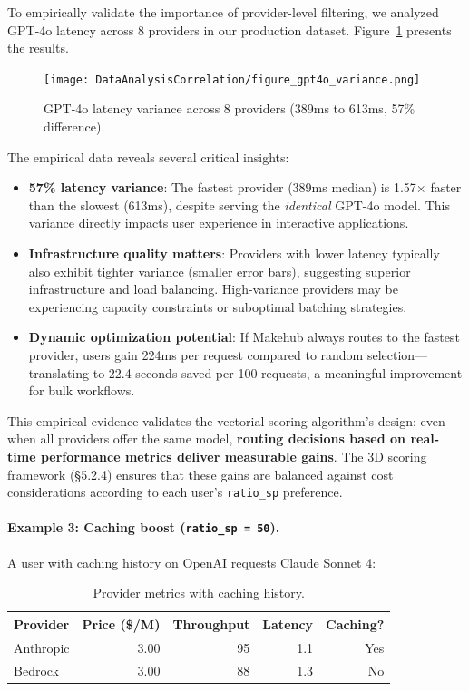 \documentclass[english]{article}
\begin{document}
To empirically validate the importance of provider-level filtering, we analyzed GPT-4o latency across 8 providers in our production dataset. Figure~\ref{fig:gpt4o_variance} presents the results.

\begin{figure}[H]
\centering
\texttt{[image: DataAnalysisCorrelation/figure\_gpt4o\_variance.png]}
\caption{GPT-4o latency variance across 8 providers (389ms to 613ms, 57\% difference).}
\label{fig:gpt4o_variance}
\end{figure}

The empirical data reveals several critical insights:
\begin{itemize}
    \item \textbf{57\% latency variance}: The fastest provider (389ms median) is 1.57× faster than the slowest (613ms), despite serving the \emph{identical} GPT-4o model. This variance directly impacts user experience in interactive applications.
    \item \textbf{Infrastructure quality matters}: Providers with lower latency typically also exhibit tighter variance (smaller error bars), suggesting superior infrastructure and load balancing. High-variance providers may be experiencing capacity constraints or suboptimal batching strategies.
    \item \textbf{Dynamic optimization potential}: If Makehub always routes to the fastest provider, users gain 224ms per request compared to random selection—translating to 22.4 seconds saved per 100 requests, a meaningful improvement for bulk workflows.
\end{itemize}

This empirical evidence validates the vectorial scoring algorithm's design: even when all providers offer the same model, \textbf{routing decisions based on real-time performance metrics deliver measurable gains}. The 3D scoring framework (§5.2.4) ensures that these gains are balanced against cost considerations according to each user's \texttt{ratio\_sp} preference.

\paragraph{Example 3: Caching boost (\texttt{ratio\_sp = 50}).}

A user with caching history on OpenAI requests Claude Sonnet 4:

\begin{table}[H]
\centering
\caption{Provider metrics with caching history.}
\begin{tabular}{|l|r|r|r|r|}
\hline
\textbf{Provider} & \textbf{Price (\$/M)} & \textbf{Throughput} & \textbf{Latency} & \textbf{Caching?} \\
\hline
Anthropic & 3.00 & 95 & 1.1 & Yes \\
Bedrock & 3.00 & 88 & 1.3 & No \\
\hline
\end{tabular}
\end{table}
\end{document}
